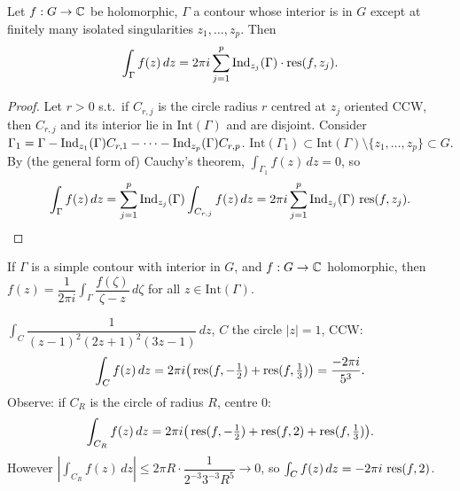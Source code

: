 \documentclass[11pt]{article}
\begin{document}
\begin{theorem}
Let $f:G\to{\mathbb{C}}$ be holomorphic, $\Gamma$ a contour whose interior is in $G$ except at finitely many isolated singularities $z_1,\dots,z_p$. Then
\[
\int_\Gamma f(z)\,dz = 2\pi i\sum_{j=1}^p \operatorname{Ind}_{z_j}(\Gamma)\cdot\operatorname{res}(f,z_j).
\]
\end{theorem}

\begin{proof}
Let $r>0$ s.t.\ if $C_{r,j}$ is the circle radius $r$ centred at $z_j$ oriented CCW, then $C_{r,j}$ and its interior lie in $\mathrm{Int}(\Gamma)$ and are disjoint. Consider $\Gamma_1 = \Gamma - \operatorname{Ind}_{z_1}(\Gamma)C_{r,1} - \dots - \operatorname{Ind}_{z_p}(\Gamma)C_{r,p}$. $\mathrm{Int}(\Gamma_1) \subset \mathrm{Int}(\Gamma)\setminus\{z_1,\dots,z_p\} \subset G$.
By (the general form of) Cauchy's theorem, $\int_{\Gamma_1} f(z)\,dz=0$, so
\[
\int_\Gamma f(z)\,dz = \sum_{j=1}^p \operatorname{Ind}_{z_j}(\Gamma)\int_{C_{r,j}} f(z)\,dz = 2\pi i\sum_{j=1}^p \operatorname{Ind}_{z_j}(\Gamma)\,\operatorname{res}(f,z_j). \qedhere
\]
\end{proof}

\begin{corollary}
If $\Gamma$ is a simple contour with interior in $G$, and $f:G\to{\mathbb{C}}$ holomorphic, then $f(z) = \dfrac{1}{2\pi i}\int_\Gamma \dfrac{f(\zeta)}{\zeta-z}\,d\zeta$ for all $z\in\mathrm{Int}(\Gamma)$.
\end{corollary}

\begin{example}
$\int_C \dfrac{1}{(z-1)^2(2z+1)^2(3z-1)}\,dz$, $C$ the circle $|z|=1$, CCW:
\[
\int_C f(z)\,dz = 2\pi i\big(\operatorname{res}(f,-\tfrac12) + \operatorname{res}(f,\tfrac13)\big) = \frac{-2\pi i}{5^3}.
\]
Observe: if $C_R$ is the circle of radius $R$, centre $0$:
\[
\int_{C_R} f(z)\,dz = 2\pi i\big(\operatorname{res}(f,-\tfrac12)+\operatorname{res}(f,2)+\operatorname{res}(f,\tfrac13)\big).
\]
However $\left|\int_{C_R} f(z)\,dz\right| \le 2\pi R\cdot \dfrac{1}{2^{-3}3^{-3}R^5} \to 0$, so $\int_C f(z)\,dz = -2\pi i\,\operatorname{res}(f,2)$.
\end{example}
\end{document}
